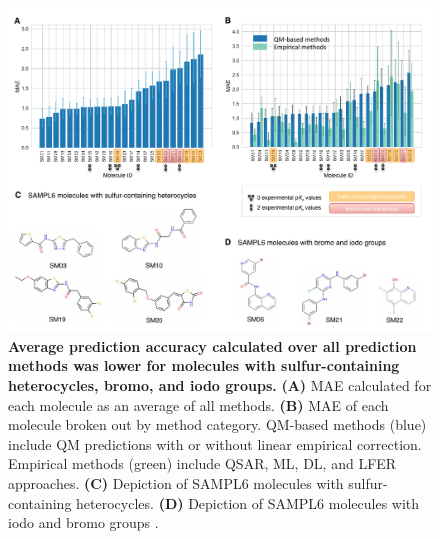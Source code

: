 \documentclass[9pt,lineno,final]{elife}
\begin{document}
\begin{figure}
\centering
\includegraphics[width=1.0\linewidth]{figures/typeIII_molecular_MAE_fig.pdf}
\caption{{\bf Average prediction accuracy calculated over all prediction methods was lower for molecules with sulfur-containing heterocycles, bromo, and iodo groups.}
{\bf(A)} MAE calculated for each molecule as an average of all methods. {\bf(B)} MAE of each molecule broken out by method category. QM-based methods (blue) include QM predictions with or without linear empirical correction. Empirical methods (green) include QSAR, ML, DL, and LFER approaches. {\bf(C)} Depiction of SAMPL6 molecules with sulfur-containing heterocycles. {\bf(D)} Depiction of SAMPL6 molecules with iodo and bromo groups .
}
\label{fig:typeIII_molecular_MAE}
\end{figure}
\end{document}
